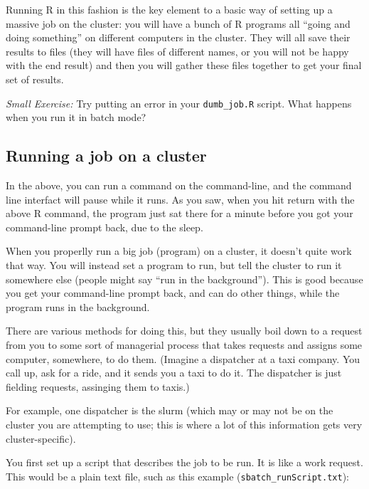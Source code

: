 \documentclass[
]{book}
\begin{document}
Running R in this fashion is the key element to a basic way of setting up a massive job on the cluster: you will have a bunch of R programs all ``going and doing something'' on different computers in the cluster.
They will all save their results to files (they will have files of different names, or you will not be happy with the end result) and then you will gather these files together to get your final set of results.

\emph{Small Exercise:} Try putting an error in your \texttt{dumb\_job.R} script. What happens when you run it in batch mode?

\hypertarget{running-a-job-on-a-cluster}{%
\subsection{Running a job on a cluster}\label{running-a-job-on-a-cluster}}

In the above, you can run a command on the command-line, and the command line interfact will pause while it runs.
As you saw, when you hit return with the above R command, the program just sat there for a minute before you got your command-line prompt back, due to the sleep.

When you properlly run a big job (program) on a cluster, it doesn't quite work that way.
You will instead set a program to run, but tell the cluster to run it somewhere else (people might say ``run in the background'').
This is good because you get your command-line prompt back, and can do other things, while the program runs in the background.

There are various methods for doing this, but they usually boil down to a request from you to some sort of managerial process that takes requests and assigns some computer, somewhere, to do them.
(Imagine a dispatcher at a taxi company. You call up, ask for a ride, and it sends you a taxi to do it. The dispatcher is just fielding requests, assinging them to taxis.)

For example, one dispatcher is the slurm (which may or may not be on the cluster you are attempting to use; this is where a lot of this information gets very cluster-specific).

You first set up a script that describes the job to be run.
It is like a work request.
This would be a plain text file, such as this example (\texttt{sbatch\_runScript.txt}):
\end{document}
